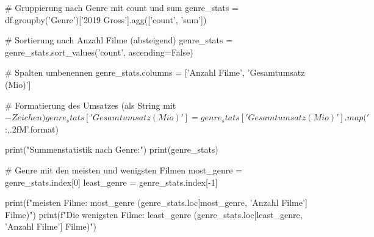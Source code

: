 # Gruppierung nach Genre mit count und sum
genre_stats = df.groupby('Genre')['2019 Gross'].agg(['count', 'sum'])

# Sortierung nach Anzahl Filme (absteigend)
genre_stats = genre_stats.sort_values('count', ascending=False)

# Spalten umbenennen
genre_stats.columns = ['Anzahl Filme', 'Gesamtumsatz (Mio)']

# Formatierung des Umsatzes (als String mit $-Zeichen)
genre_stats['Gesamtumsatz (Mio)'] = genre_stats['Gesamtumsatz (Mio)'].map('${:,.2f}M'.format)

print("Summenstatistik nach Genre:")
print(genre_stats)

# Genre mit den meisten und wenigsten Filmen
most_genre = genre_stats.index[0]
least_genre = genre_stats.index[-1]

print(f"\nDie meisten Filme: {most_genre} ({genre_stats.loc[most_genre, 'Anzahl Filme']} Filme)")
print(f"Die wenigsten Filme: {least_genre} ({genre_stats.loc[least_genre, 'Anzahl Filme']} Filme)")